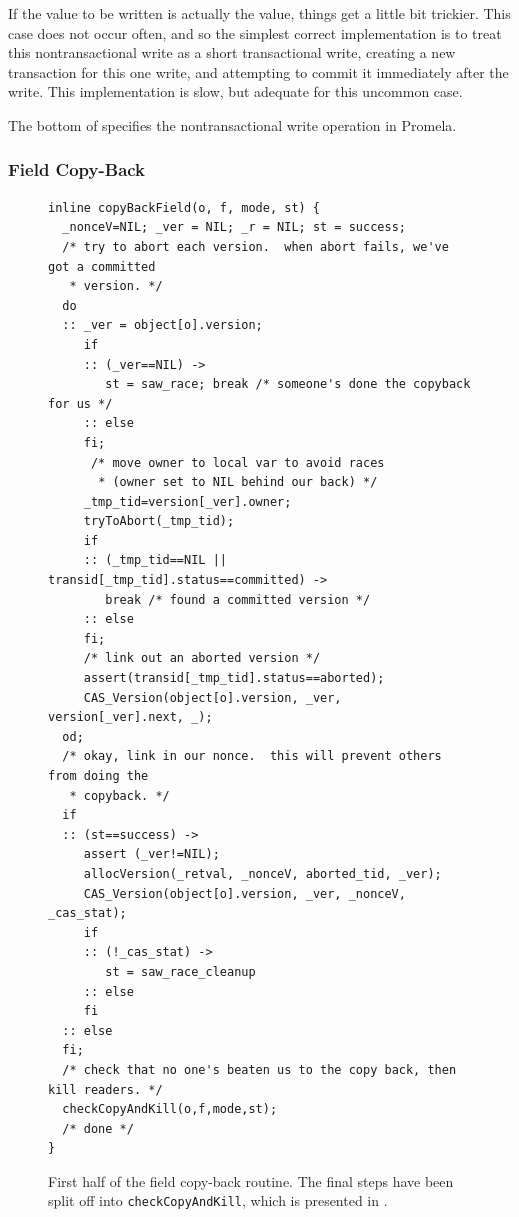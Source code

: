 If the value to be written is actually the \FLAG value, things get a
little bit trickier.  This case does not occur often, and so the
simplest correct implementation is to treat this nontransactional
write as a short transactional write, creating a new transaction for
this one write, and attempting to commit it immediately after the
write.  This implementation is slow, but adequate for this uncommon case.

The bottom of  specifies the nontransactional
write operation in Promela.

\subsubsection{Field Copy-Back}\label{sec:copyback}
\begin{figure}\sis\fontsize{9}{10}
\begin{verbatim}
inline copyBackField(o, f, mode, st) {
  _nonceV=NIL; _ver = NIL; _r = NIL; st = success;
  /* try to abort each version.  when abort fails, we've got a committed
   * version. */
  do
  :: _ver = object[o].version;
     if
     :: (_ver==NIL) ->
        st = saw_race; break /* someone's done the copyback for us */
     :: else
     fi;
      /* move owner to local var to avoid races
       * (owner set to NIL behind our back) */
     _tmp_tid=version[_ver].owner;
     tryToAbort(_tmp_tid);
     if
     :: (_tmp_tid==NIL || transid[_tmp_tid].status==committed) ->
        break /* found a committed version */
     :: else
     fi;
     /* link out an aborted version */
     assert(transid[_tmp_tid].status==aborted);
     CAS_Version(object[o].version, _ver, version[_ver].next, _);
  od;
  /* okay, link in our nonce.  this will prevent others from doing the
   * copyback. */
  if
  :: (st==success) ->
     assert (_ver!=NIL);
     allocVersion(_retval, _nonceV, aborted_tid, _ver);
     CAS_Version(object[o].version, _ver, _nonceV, _cas_stat);
     if
     :: (!_cas_stat) ->
        st = saw_race_cleanup
     :: else
     fi
  :: else
  fi;
  /* check that no one's beaten us to the copy back, then kill readers. */
  checkCopyAndKill(o,f,mode,st);
  /* done */
}
\end{verbatim}
\caption[First half of the field copy-back routine.]
{First half of the field copy-back routine.  The final steps
  have been split off into \texttt{checkCopyAndKill}, which is
  presented in .}\label{fig:copyback1}
\end{figure}
